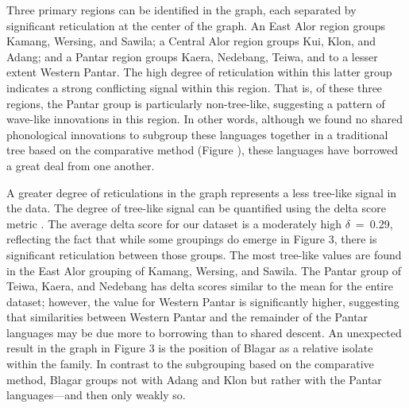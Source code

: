 Three primary regions can be identified in the graph, each separated by significant reticulation at the center of the graph. An East Alor region groups Kamang, Wersing, and Sawila; a Central Alor region groups Kui, Klon, and Adang; and a Pantar region groups Kaera, Nedebang, Teiwa, and to a lesser extent Western Pantar. The high degree of reticulation within this latter group indicates a strong conflicting signal within this region. That is, of these three regions, the Pantar group is particularly non-tree-like, suggesting a pattern of wave-like innovations in this region. In other words, although we found no shared phonological innovations to subgroup these languages together in a traditional tree based on the comparative method (Figure ), these languages have borrowed a great deal from one another.

A greater degree of reticulations in the graph represents a less tree-like signal in the data. The degree of tree-like signal can be quantified using the delta score metric \citep{WichmannEtAl2011,HollandEtAl2002}. The average delta score for our dataset is a moderately high $\delta $~=~0.29, reflecting the fact that while some groupings do emerge in Figure 3, there is significant reticulation between those groups. The most tree-like values are found in the East Alor grouping of Kamang, Wersing, and Sawila. The Pantar group of Teiwa, Kaera, and Nedebang has delta scores similar to the mean for the entire dataset; however, the value for Western Pantar is significantly higher, suggesting that similarities between Western Pantar and the remainder of the Pantar languages may be due more to borrowing than to shared descent. An unexpected result in the graph in Figure 3 is the position of Blagar as a relative isolate within the family. In contrast to the subgrouping based on the comparative method, Blagar
groups not with Adang and Klon but rather with the Pantar languages---and then only weakly so.

